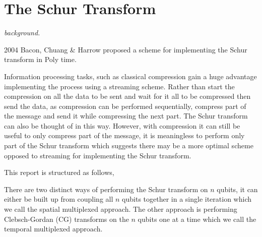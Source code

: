 \section{The Schur Transform}

\textit{background.}

2004 Bacon, Chuang \& Harrow proposed a scheme for implementing the Schur transform in Poly time. 


Information processing tasks, such as classical compression gain a huge advantage implementing the process using a streaming scheme. Rather than start the compression on all the data to be sent and wait for it all to be compressed then send the data, as compression can be performed sequentially, compress part of the message and send it while compressing the next part. The Schur transform can also be thought of in this way. However, with compression it can still be useful to only compress part of the message, it is meaningless to perform only part of the Schur transform which suggests there may be a more optimal scheme opposed to streaming for implementing the Schur transform.      

This report is structured as follows,   

There are two distinct ways of performing the Schur transform on $n$ qubits, it can either be built up from coupling
all $n$ qubits together in a single iteration which we call the spatial multiplexed approach. The other approach is 
performing Clebsch-Gordan (CG) transforms on the $n$ qubits one at a time which we call the temporal multiplexed 
approach.  



